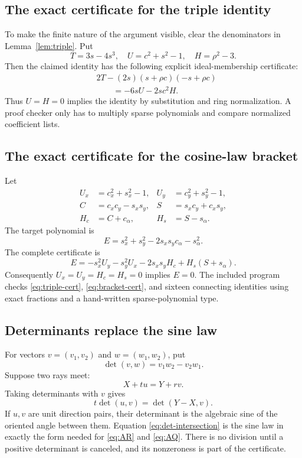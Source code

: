 \documentclass[11pt]{article}
\theoremstyle{definition}
\newcommand{\detv}{\operatorname{det}}
\begin{document}
\subsection{The exact certificate for the triple identity}
To make the finite nature of the argument visible, clear the denominators in
Lemma~\ref{lem:triple}.  Put
\[
 T=3s-4s^3,
 \quad U=c^2+s^2-1,
 \quad H=\rho^2-3.
\]
Then the claimed identity has the following explicit ideal-membership
certificate:
\begin{align}
&2T-(2s)(s+\rho c)(-s+\rho c)\\
&\qquad=-6sU-2sc^2H.
\tag{3.5}\label{eq:triple-cert}
\end{align}
Thus $U=H=0$ implies the identity by substitution and ring normalization.
A proof checker only has to multiply sparse polynomials and compare normalized
coefficient lists.

\subsection{The exact certificate for the cosine-law bracket}
Let
\begin{align*}
 U_x&=c_x^2+s_x^2-1,&
 U_y&=c_y^2+s_y^2-1,\\
 C&=c_xc_y-s_xs_y,&
 S&=s_xc_y+c_xs_y,\\
 H_c&=C+c_\alpha,&
 H_s&=S-s_\alpha.
\end{align*}
The target polynomial is
\[
 E=s_x^2+s_y^2-2s_xs_yc_\alpha-s_\alpha^2.
\]
The complete certificate is
\begin{equation}
 E=-s_x^2U_y-s_y^2U_x-2s_xs_yH_c+H_s(S+s_\alpha).
 \tag{3.6}\label{eq:bracket-cert}
\end{equation}
Consequently $U_x=U_y=H_c=H_s=0$ implies $E=0$.  The included program
 checks
\eqref{eq:triple-cert}, \eqref{eq:bracket-cert}, and sixteen connecting
identities using exact fractions and a hand-written sparse-polynomial type.

\subsection{Determinants replace the sine law}
\label{sec:determinants}
For vectors $v=(v_1,v_2)$ and $w=(w_1,w_2)$, put
\[
 \detv(v,w)=v_1w_2-v_2w_1.
\]
Suppose two rays meet:
\[
  X+t u=Y+r v.
\]
Taking determinants with $v$ gives
\[
  t\detv(u,v)=\detv(Y-X,v).
 \tag{3.7}\label{eq:det-intersection}
\]
If $u,v$ are unit direction pairs, their determinant is the algebraic sine of
the oriented angle between them.  Equation \eqref{eq:det-intersection} is the
sine law in exactly the form needed for \eqref{eq:AR} and \eqref{eq:AQ}.
There is no division until a positive determinant is canceled, and its
nonzeroness is part of the certificate.
\end{document}
